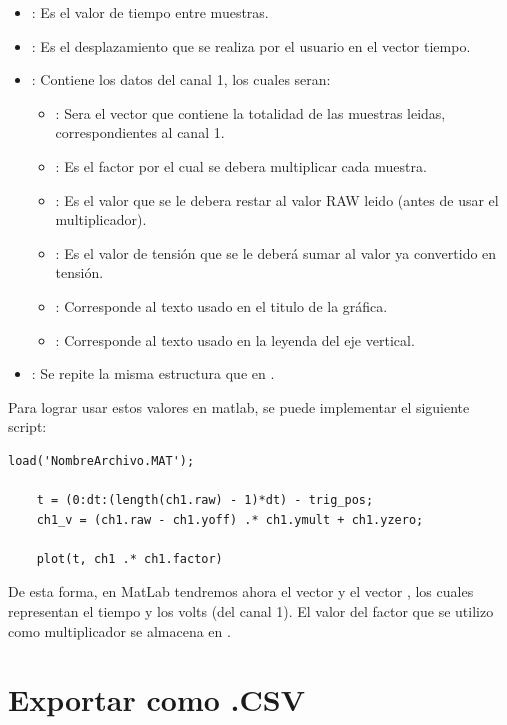\begin{itemize}
	\item {}: Es el valor de tiempo entre muestras.
	\item {}: Es el desplazamiento que se realiza por el usuario en el vector tiempo.
	\item {}: Contiene los datos del canal 1, los cuales seran:
	\begin{itemize}
		\item {}: Sera el vector que contiene la totalidad de las muestras leidas, correspondientes al canal 1.
		\item {}: Es el factor por el cual se debera multiplicar cada muestra.
		\item {}: Es el valor que se le debera restar al valor RAW leido (antes de usar el multiplicador).
		\item {}: Es el valor de tensión que se le deberá sumar al valor ya convertido en tensión.
		\item {}: Corresponde al texto usado en el titulo de la gráfica.
		\item {}: Corresponde al texto usado en la leyenda del eje vertical.
	\end{itemize}
	\item {}: Se repite la misma estructura que en .
\end{itemize}

Para lograr usar estos valores en matlab, se puede implementar el siguiente script:

\begin{lstlisting}[style=Matlab, firstnumber=1]
	load('NombreArchivo.MAT');
	
	t = (0:dt:(length(ch1.raw) - 1)*dt) - trig_pos;
	ch1_v = (ch1.raw - ch1.yoff) .* ch1.ymult + ch1.yzero;
	
	plot(t, ch1 .* ch1.factor)
\end{lstlisting}

De esta forma, en MatLab tendremos ahora el vector  y el vector , los cuales representan el tiempo y los volts (del canal 1). El valor del factor que se utilizo como multiplicador se almacena en .



\section{Exportar como .CSV}

